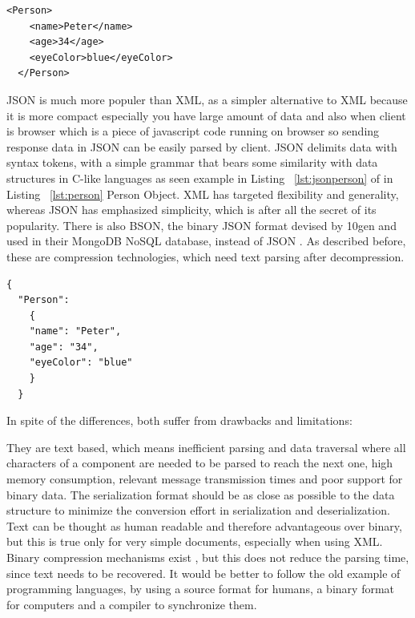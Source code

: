 \begin{lstlisting}[caption=JSON presentation of Person object, label=lst:xmlperson]
  <Person>
    <name>Peter</name>
    <age>34</age>
    <eyeColor>blue</eyeColor>
  </Person>
\end{lstlisting}
JSON is much more populer than XML\citep{thesis:state6}, as a simpler alternative to XML because it is more compact especially you have large amount of data and also when client is browser which is a piece of javascript code running on browser so sending response data in JSON can be easily parsed by client. JSON delimits data with syntax tokens, with a simple grammar that bears some similarity with data structures in C-like languages as seen example in Listing ~\ref{lst:jsonperson} of in Listing ~\ref{lst:person} Person Object. XML has targeted flexibility and generality, whereas JSON has emphasized simplicity, which is after all the secret of its popularity. There is also BSON, the binary JSON format devised by 10gen and used in their MongoDB NoSQL database, instead of JSON \citep{thesis:state8}. As described before, these are compression technologies, which need text parsing after decompression.

\begin{lstlisting}[caption=JSON presentation of Person object, label=lst:jsonperson]
  {
  "Person":
    {
    "name": "Peter",
    "age": "34",
    "eyeColor": "blue"
    }
  }
\end{lstlisting}
In spite of the differences, both suffer from drawbacks and limitations:

They are text based, which means inefficient parsing and data traversal where all characters of a component are needed to be parsed to reach the next one, high memory consumption, relevant message transmission times and poor support for binary data. The serialization format should be as close as possible to the data structure to minimize the conversion effort in serialization and deserialization. Text can be thought as human readable and therefore advantageous over binary, but this is true only for very simple documents, especially when using XML. Binary compression mechanisms exist \citep{thesis:state5_3}\citep{thesis:state5_4}, but this does not reduce the parsing time, since text needs to be recovered. It would be better to follow the old example of programming languages, by using a source format for humans, a binary format for computers and a compiler to synchronize them.\citep{thesis:state6}


